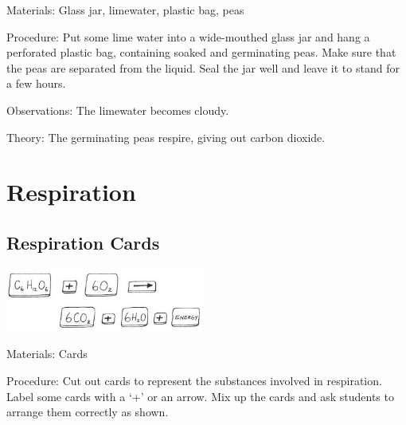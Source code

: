 \begin{multicols}{2}
\begin{description*}
\item[Materials:]{Glass jar, limewater, plastic bag, peas}
\item[Procedure:]{Put some lime water into a wide-mouthed glass jar and hang a perforated plastic bag,
containing soaked and germinating peas. Make sure that the peas are separated from the
liquid. Seal the jar well and leave it to stand for a few hours.}
\item[Observations:]{The limewater becomes cloudy.}
\item[Theory:]{The germinating peas respire, giving out carbon dioxide.}
\end{description*}

\columnbreak


\section*{Respiration} 


\subsection{Respiration Cards} %

\begin{center}
\includegraphics[width=0.49\textwidth]{./img/vso/respiration-cards.jpg}
\end{center}

\begin{description*}
\item[Materials:]{Cards}
\item[Procedure:]{Cut out cards to represent the substances involved in respiration. Label
some cards with a `+' or an arrow. Mix up the cards and ask students to
arrange them correctly as shown.}
\end{description*}


\end{multicols}
